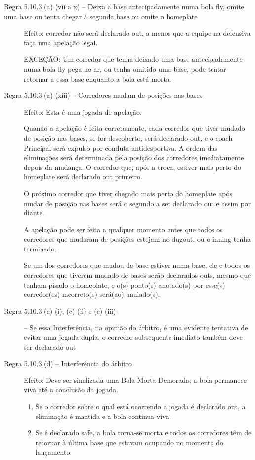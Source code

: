 \begin{description}
	\item[Regra 5.10.3 (a) (vii a x) -- Deixa a base antecipadamente numa bola \gls{fly}, omite uma base ou tenta chegar à segunda base ou omite o \gls{homeplate}]  	Efeito: corredor não será declarado \gls{out}, a menos que a equipe na defensiva faça uma apelação legal.

	EXCEÇÃO: Um corredor que tenha deixado uma base antecipadamente numa bola \gls{fly} pega no ar, ou tenha omitido uma base, pode tentar retornar a essa base enquanto a bola está morta.

	\item [Regra 5.10.3 (a) (xiii) -- Corredores mudam de posições nas bases] Efeito: Esta é uma jogada de a\-pe\-la\-ção.

	Quando a apelação é feita corretamente, cada corredor que tiver mudado de posição nas bases, se for descoberto, será declarado \gls{out}, e o \gls{coach} Principal será expulso por conduta antidesportiva. A ordem das eliminações será determinada pela posição dos corredores imediatamente depois da mudança. O corredor que, após a troca, estiver mais perto do \gls{homeplate} será declarado \gls{out} primeiro.

	O próximo corredor que tiver chegado mais perto do \gls{homeplate} após mudar de posição nas bases será o segundo a ser declarado \gls{out} e assim por diante.

	A apelação pode ser feita a qualquer momento antes que todos os corredores que mudaram de posições estejam no \gls{dugout}, ou o \gls{inning} tenha terminado.

	Se um dos corredores que mudou de base estiver numa base, ele e todos os corredores que tiverem mudado de bases serão declarados \gls{out}s, mesmo que tenham pisado o \gls{homeplate}, e o(s) ponto(s) anotado(s) por esse(s) corredor(es) incorreto(s) será(ão) anulado(s).

 \item[Regra 5.10.3 (c) (i), (c) (ii) e (c) (iii)] -- Se essa Interferência, na opinião do árbitro, é uma evidente tentativa de evitar uma jogada dupla, o corredor
subsequente imediato também deve ser declarado \gls{out}

\item[Regra 5.10.3 (d) -- Interferência do árbitro] Efeito: Deve ser sinalizada uma Bola Morta Demorada; a bola permanece viva até a conclusão da jogada.

\begin{enumerate}[label=\roman*.]
	\item Se o corredor sobre o qual está ocorrendo a jogada é declarado \gls{out}, a eliminação é mantida e a bola continua viva.

	\item Se é declarado \gls{safe}, a bola torna-se morta e todos os corredores têm de retornar à última base que estavam ocupando no momento do lançamento.
\end{enumerate}

\end{description}


